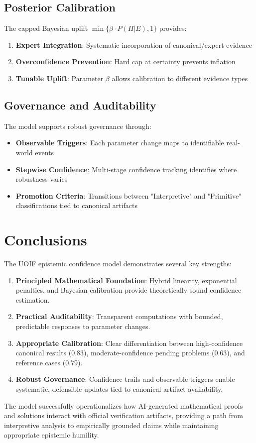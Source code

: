 \documentclass[12pt,a4paper]{article}
\begin{document}
\subsection{Posterior Calibration}

The capped Bayesian uplift $\min\{\beta \cdot P(H|E), 1\}$ provides:

\begin{enumerate}
    \item \textbf{Expert Integration}: Systematic incorporation of canonical/expert evidence
    \item \textbf{Overconfidence Prevention}: Hard cap at certainty prevents inflation
    \item \textbf{Tunable Uplift}: Parameter $\beta$ allows calibration to different evidence types
\end{enumerate}

\subsection{Governance and Auditability}

The model supports robust governance through:

\begin{itemize}
    \item \textbf{Observable Triggers}: Each parameter change maps to identifiable real-world events
    \item \textbf{Stepwise Confidence}: Multi-stage confidence tracking identifies where robustness varies
    \item \textbf{Promotion Criteria}: Transitions between "Interpretive" and "Primitive" classifications tied to canonical artifacts
\end{itemize}

\section{Conclusions}

The UOIF epistemic confidence model demonstrates several key strengths:

\begin{enumerate}
    \item \textbf{Principled Mathematical Foundation}: Hybrid linearity, exponential penalties, and Bayesian calibration provide theoretically sound confidence estimation.
    
    \item \textbf{Practical Auditability}: Transparent computations with bounded, predictable responses to parameter changes.
    
    \item \textbf{Appropriate Calibration}: Clear differentiation between high-confidence canonical results (0.83), moderate-confidence pending problems (0.63), and reference cases (0.79).
    
    \item \textbf{Robust Governance}: Confidence trails and observable triggers enable systematic, defensible updates tied to canonical artifact availability.
\end{enumerate}

The model successfully operationalizes how AI-generated mathematical proofs and solutions interact with official verification artifacts, providing a path from interpretive analysis to empirically grounded claims while maintaining appropriate epistemic humility.
\end{document}
